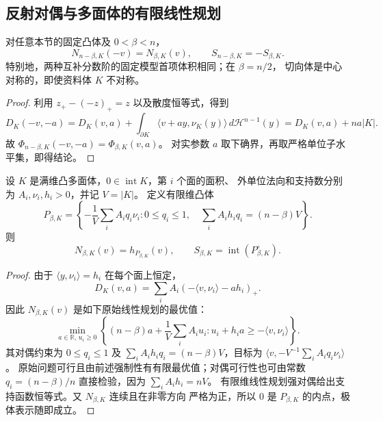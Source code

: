 \subsection{反射对偶与多面体的有限线性规划}

\begin{proposition}[互补分数阶的反射对偶]\label{cvx:reflection-duality}
对任意本节的固定凸体及 $0<\beta<n$，
\[
 N_{n-\beta,K}(-v)=N_{\beta,K}(v),\qquad
 S_{n-\beta,K}=-S_{\beta,K}.
\]
特别地，两种互补分数阶的固定模型首项体积相同；在 $\beta=n/2$，
切向体是中心对称的，即使资料体 $K$ 不对称。
\end{proposition}
\begin{proof}
利用 $z_+-(-z)_+=z$ 以及散度恒等式，得到
\[
 D_K(-v,-a)=D_K(v,a)+
 \int_{\partial K}\langle v+ay,\nu_K(y)\rangle\,d\mathcal H^{n-1}(y)
 =D_K(v,a)+na|K|.
\]
故 $\Phi_{n-\beta,K}(-v,-a)=\Phi_{\beta,K}(v,a)$。
对实参数 $a$ 取下确界，再取严格单位子水平集，即得结论。
\end{proof}

\begin{theorem}[多面体切向体的极体表示]\label{cvx:polytope-duality}
设 $K$ 是满维凸多面体，$0\in\operatorname{int}K$，第 $i$ 个面的面积、
外单位法向和支持数分别为 $A_i,\nu_i,h_i>0$，并记 $V=|K|$。
定义有限维凸体
\begin{equation}\label{cvx:dual-polytope}
 P_{\beta,K}=
 \left\{-\frac1V\sum_iA_iq_i\nu_i:
 0\le q_i\le1,\quad\sum_i A_ih_iq_i=(n-\beta)V\right\}.
\end{equation}
则
\[
 N_{\beta,K}(v)=h_{P_{\beta,K}}(v),\qquad
 S_{\beta,K}=\operatorname{int}(P_{\beta,K}^\circ).
\]
\end{theorem}
\begin{proof}
由于 $\langle y,\nu_i\rangle=h_i$ 在每个面上恒定，
\[
 D_K(v,a)=\sum_i A_i(-\langle v,\nu_i\rangle-ah_i)_+.
\]
因此 $N_{\beta,K}(v)$ 是如下原始线性规划的最优值：
\[
 \min_{a\in\mathbb R,\,u_i\ge0}
 \left\{(n-\beta)a+\frac1V\sum_iA_iu_i:
 u_i+h_i a\ge-\langle v,\nu_i\rangle\right\}.
\]
其对偶约束为 $0\le q_i\le1$ 及
$\sum_i A_ih_iq_i=(n-\beta)V$，目标为
$\langle v,-V^{-1}\sum_i A_iq_i\nu_i\rangle$。
原始问题可行且由前述强制性有有限最优值；对偶可行性也可由常数
$q_i=(n-\beta)/n$ 直接检验，因为 $\sum_iA_ih_i=nV$。
有限维线性规划强对偶给出支持函数恒等式。又 $N_{\beta,K}$ 连续且在非零方向
严格为正，所以 $0$ 是 $P_{\beta,K}$ 的内点，极体表示随即成立。
\end{proof}

